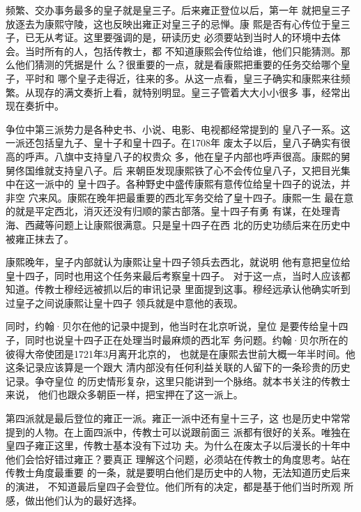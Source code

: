 频繁、交办事务最多的皇子就是皇三子。后来雍正登位以后，第一年%
就把皇三子放逐去为康熙守陵，这也反映出雍正对皇三子的忌惮。康%
熙是否有心传位于皇三子，已无从考证。这里要强调的是，研读历史%
必须要站到当时人的环境中去体会。当时所有的人，包括传教士，都%
不知道康熙会传位给谁，他们只能猜测。那么他们猜测的凭据是什%
么？很重要的一点，就是看康熙把重要的任务交给哪个皇子，平时和%
哪个皇子走得近，往来的多。从这一点看，皇三子确实和康熙来往频%
繁。从现存的满文奏折上看，就特别明显。皇三子管着大大小小很多%
事，经常出现在奏折中。%
\par
争位中第三派势力是各种史书、小说、电影、电视都经常提到的%
皇八子一系。这一派还包括皇九子、皇十子和皇十四子。在1708年%
废太子以后，皇八子确实有很高的呼声。八旗中支持皇八子的权贵众%
多，他在皇子内部也呼声很高。康熙的舅舅佟国维就支持皇八子。后%
来朝臣发现康熙铁了心不会传位皇八子，又把目光集中在这一派中的%
皇十四子。各种野史中盛传康熙有意传位给皇十四子的说法，并非空%
穴来风。康熙在晚年把最重要的西北军务交给了皇十四子。康熙一生%
最在意的就是平定西北，消灭还没有归顺的蒙古部落。皇十四子有勇%
有谋，在处理青海、西藏等问题上让康熙很满意。只是皇十四子在西%
北的历史功绩后来在历史中被雍正抹去了。%
\par
康熙晚年，皇子内部就认为康熙让皇十四子领兵去西北，就说明%
他有意把皇位给皇十四子，同时也用这个任务来最后考察皇十四子。%
对于这一点，当时人应该都知道。传教士穆经远被抓以后的审讯记录%
里面提到这事。穆经远承认他确实听到过皇子之间说康熙让皇十四子%
领兵就是中意他的表现。%
\par
同时，约翰·贝尔在他的记录中提到，他当时在北京听说，皇位%
是要传给皇十四子，同时也说皇十四子正在处理当时最麻烦的西北军%
务问题。约翰·贝尔所在的彼得大帝使团是1721年3月离开北京的，%
也就是在康熙去世前大概一年半时间。他这条记录应该算是一个跟大%
清内部没有任何利益关联的人留下的一条珍贵的历史记录。争夺皇位%
的历史情形复杂，这里只能讲到一个脉络。就本书关注的传教士来说，%
他们也跟众多朝臣一样，把宝押在了这一派上。%
\par
第四派就是最后登位的雍正一派。雍正一派中还有皇十三子，这%
也是历史中常常提到的人物。在上面四派中，传教士可以说跟前面三%
派都有很好的关系。唯独在皇四子雍正这里，传教士基本没有下过功%
夫。为什么在废太子以后漫长的十年中他们会恰好错过雍正？要真正%
理解这个问题，必须站在传教士的角度思考。站在传教士角度最重要%
的一条，就是要明白他们是历史中的人物，无法知道历史后来的演进，%
不知道最后皇四子会登位。他们所有的决定，都是基于他们当时所观%
所感，做出他们认为的最好选择。%
